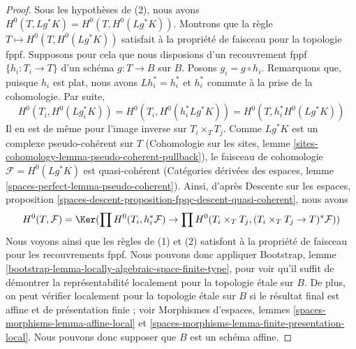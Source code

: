 \begin{proof}
Sous les hypothèses de (2), nous avons
$H^0(T, Lg^*K) = H^0(T, H^0(Lg^*K))$. Montrons que la règle
$T \mapsto H^0(T, H^0(Lg^*K))$ satisfait à la propriété de faisceau pour la
topologie fppf. Supposons pour cela que nous disposions d'un recouvrement fppf
$\{h_i : T_i \to T\}$ d'un schéma $g : T \to B$ sur $B$. Posons
$g_i = g \circ h_i$. Remarquons que, puisque $h_i$ est plat, nous avons
$Lh_i^* = h_i^*$ et $h_i^*$ commute à la prise de la cohomologie. Par suite,
$$
H^0(T_i, H^0(Lg_i^*K)) =
H^0(T_i, H^0(h_i^*Lg^*K)) =
H^0(T, h_i^*H^0(Lg^*K))
$$
Il en est de même pour l'image inverse sur $T_i \times_T T_j$. Comme
$Lg^*K$ est un complexe pseudo-cohérent sur $T$ (Cohomologie sur les sites,
lemme \ref{sites-cohomology-lemma-pseudo-coherent-pullback}), le faisceau de
cohomologie $\mathcal{F} = H^0(Lg^*K)$ est quasi-cohérent (Catégories dérivées
des espaces, lemme \ref{spaces-perfect-lemma-pseudo-coherent}). Ainsi, d'après
Descente sur les espaces, proposition
\ref{spaces-descent-proposition-fpqc-descent-quasi-coherent}, nous avons
$$
H^0(T, \mathcal{F}) = \Ker(
\prod H^0(T_i, h_i^*\mathcal{F}) \to
\prod H^0(T_i \times_T T_j, (T_i \times_T T_j \to T)^*\mathcal{F}))
$$
Nous voyons ainsi que les règles de (1) et (2) satisfont à la propriété de
faisceau pour les recouvrements fppf. Nous pouvons donc appliquer Bootstrap,
lemme \ref{bootstrap-lemma-locally-algebraic-space-finite-type}, pour voir
qu'il suffit de démontrer la représentabilité localement pour la topologie
étale sur $B$. De plus, on peut vérifier localement pour la topologie étale
sur $B$ si le résultat final est affine et de présentation finie ; voir
Morphismes d'espaces, lemmes \ref{spaces-morphisms-lemma-affine-local} et
\ref{spaces-morphisms-lemma-finite-presentation-local}. Nous pouvons donc
supposer que $B$ est un schéma affine.


\end{proof}
